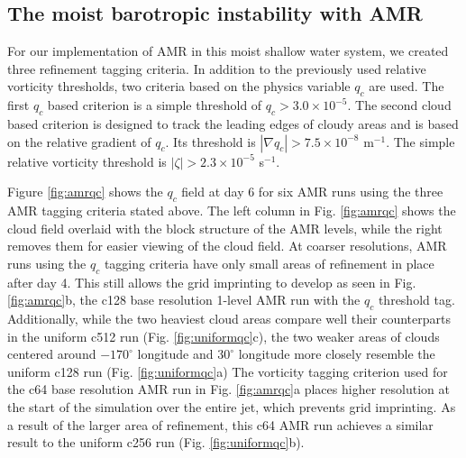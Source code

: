 \documentclass{ametsoc}
\begin{document}
\subsection{The moist barotropic instability with AMR}
  For our implementation of AMR in this moist shallow water
system, we created three refinement tagging criteria. In addition to
the previously used relative vorticity thresholds, two criteria based
on the physics variable $q_c$ are used. The first $q_c$ based criterion is a 
simple threshold of $q_c > 3.0 \times 10^{-5}$. The second cloud based 
criterion is designed to track the leading edges of cloudy areas and is based on the relative gradient of $q_c$. 
Its threshold is $|\nabla q_c| > 7.5\times 10^{-8}$ m$^{-1}$.
The simple relative vorticity threshold is $|\zeta| > 2.3 \times 10^{-5}$ s$^{-1}$.

Figure \ref{fig:amrqc} shows the $q_c$ field at day 6 for six AMR runs using the three
AMR tagging criteria stated above. The left column in Fig.  \ref{fig:amrqc} shows the
cloud field overlaid with the block structure of the AMR levels, while the right removes
them for easier viewing of the cloud field. 
At coarser resolutions, AMR runs using the $q_c$ tagging criteria have only small 
areas of refinement in place after day 4. This still allows 
the grid imprinting to develop as seen in Fig. \ref{fig:amrqc}b, the c128 base resolution
1-level AMR run with the $q_c$ threshold tag. Additionally, while the two
heaviest cloud areas compare well their counterparts in the uniform c512 run (Fig. \ref{fig:uniformqc}c),
the two weaker areas of clouds centered around $-170^\circ$ longitude
and $30^\circ$ longitude more closely resemble the uniform c128 run (Fig. \ref{fig:uniformqc}a)
The vorticity tagging
criterion used for the c64 base resolution AMR run in Fig. \ref{fig:amrqc}a places higher resolution 
at the start of the simulation over the entire jet, which prevents grid imprinting.
As a result of the larger area of refinement, this c64 AMR run achieves a similar result to the
uniform c256 run (Fig. \ref{fig:uniformqc}b). 
\end{document}
